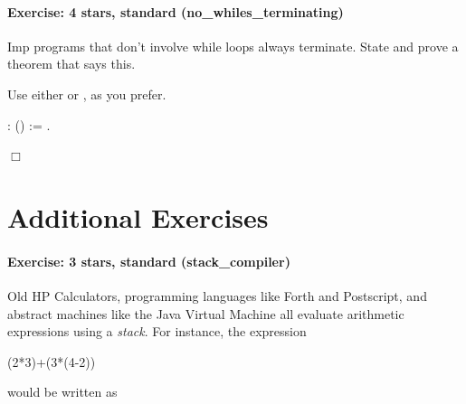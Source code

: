 \documentclass[12pt]{report}
\begin{document}
\paragraph{Exercise: 4 stars, standard (no\_whiles\_terminating)}




    Imp programs that don't involve while loops always terminate.
    State and prove a theorem  that says this.


    Use either  or , as you prefer. 
\begin{coqdoccode}
\coqdocemptyline
\coqdocemptyline
\coqdocnoindent
{}  :  () := .\coqdoceol
\end{coqdoccode}
\ensuremath{\Box} 
\begin{coqdoccode}
\coqdocemptyline
\end{coqdoccode}
\section{Additional Exercises}



\paragraph{Exercise: 3 stars, standard (stack\_compiler)}




    Old HP Calculators, programming languages like Forth and Postscript,
    and abstract machines like the Java Virtual Machine all evaluate
    arithmetic expressions using a \textit{stack}. For instance, the expression


      (2*3)+(3*(4-2))


   would be written as
\end{document}
